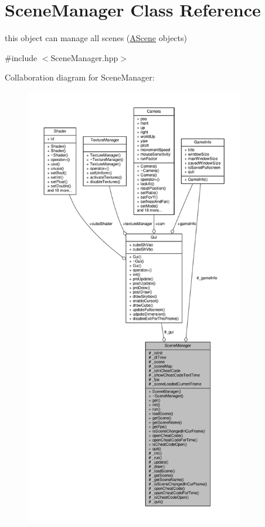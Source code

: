\hypertarget{class_scene_manager}{}\section{Scene\+Manager Class Reference}
\label{class_scene_manager}


this object can manage all scenes (\hyperlink{class_a_scene}{A\+Scene} objects)  




{\ttfamily \#include $<$Scene\+Manager.\+hpp$>$}



Collaboration diagram for Scene\+Manager\+:
\nopagebreak
\begin{figure}[H]
\begin{center}
\leavevmode
\includegraphics[height=550pt]{class_scene_manager__coll__graph}
\end{center}
\end{figure}
